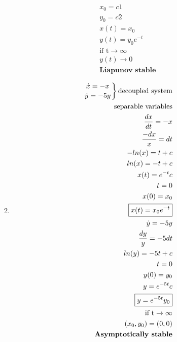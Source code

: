 \documentclass[a4paper,10pt]{article}
\begin{document}
\begin{enumerate}
\begin{enumerate}
\begin{equation}
\begin{aligned}
                        x_{0}= c1\\
                        y_{0}=c2\\
                        x(t)= x_{0}\\
                        y(t)= y_{0}e^{-t}\\
                        \text{if  t} \to \infty\\
                        y(t) \to 0 \\
                        \textbf{Liapunov stable}
                    \end{aligned}
                \end{equation}
                
            \item 
                \begin{equation}
                    \begin{aligned}
                        \left.
                        \dot{x}=-x \atop
                        \dot{y}= -5y
                        \right\}{\text{decoupled system}}\\
                        \text{separable variables}\\
                        \frac{dx}{dt}= -x\\
                        \frac{-dx}{x}= dt\\
                        -ln(x)= t +c\\
                        ln(x)= -t +c\\
                        x(t)= e^{-t}c\\
                        t=0\\
                        x(0)=x_{0}\\
                        \boxed{x(t)= x_{0}e^{-t}}\\
                        \dot{y}=-5y\\
                        \frac{dy}{y}= -5dt\\
                        ln(y)= -5t +c\\
                        t=0\\
                        y(0)=y_{0}\\
                        y=e^{-5t}c\\
                        \boxed{y=e^{-5t}y_{0}}\\
                        \text{if  t} \to \infty\\
                        (x_{0},y_{0})=(0,0)\\
                        \textbf{Asymptotically stable}
                    

\end{aligned}
\end{equation}
\end{enumerate}
\end{enumerate}
\end{document}
